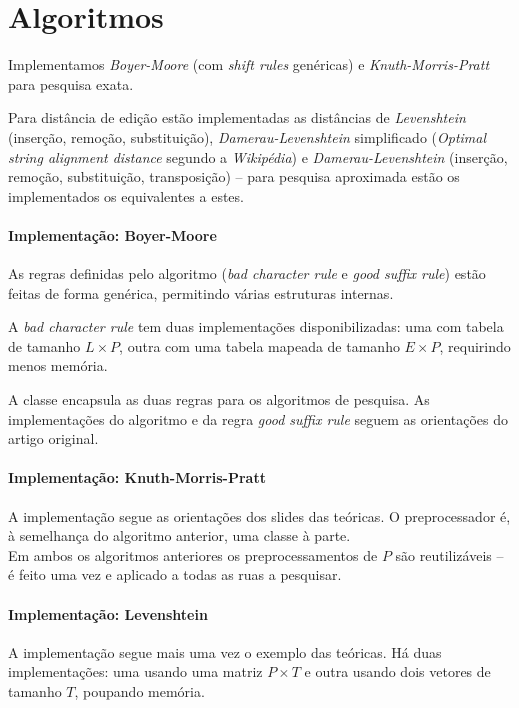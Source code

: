 \documentclass[relatorio.tex]{subfiles}
\begin{document}
\section{Algoritmos}
\label{sec:alg}

Implementamos \emph{Boyer-Moore} (com \textit{shift rules} genéricas) e \emph{Knuth-Morris-Pratt} para pesquisa exata.

Para distância de edição estão implementadas as distâncias de \emph{Levenshtein} (inserção, remoção, substituição), \emph{Damerau-Levenshtein} simplificado (\emph{Optimal string alignment distance} segundo a \textit{Wikipédia}) e \emph{Damerau-Levenshtein} (inserção, remoção, substituição, transposição) -- para pesquisa aproximada estão os implementados os equivalentes a estes.

\paragraph{Implementação: Boyer-Moore}
As regras definidas pelo algoritmo (\emph{bad character rule} e \emph{good suffix rule}) estão feitas de forma genérica, permitindo várias estruturas internas.

A \emph{bad character rule} tem duas implementações disponibilizadas: uma com tabela de tamanho $L\times P$, outra com uma tabela mapeada de tamanho $E\times P$, requirindo menos memória.

A classe  encapsula as duas regras para os algoritmos de pesquisa. As implementações do algoritmo e da regra \emph{good suffix rule} seguem as orientações do artigo original\cite{boyermoore}.

\paragraph{Implementação: Knuth-Morris-Pratt}
A implementação segue as orientações dos slides das teóricas. O preprocessador é, à semelhança do algoritmo anterior, uma classe à parte.\\

Em ambos os algoritmos anteriores os preprocessamentos de $P$ são reutilizáveis -- é feito uma vez e aplicado a todas as ruas a pesquisar.

\paragraph{Implementação: Levenshtein}
A implementação segue mais uma vez o exemplo das teóricas. Há duas implementações: uma usando uma matriz $P\times T$ e outra usando dois vetores de tamanho $T$, poupando memória.
\end{document}
